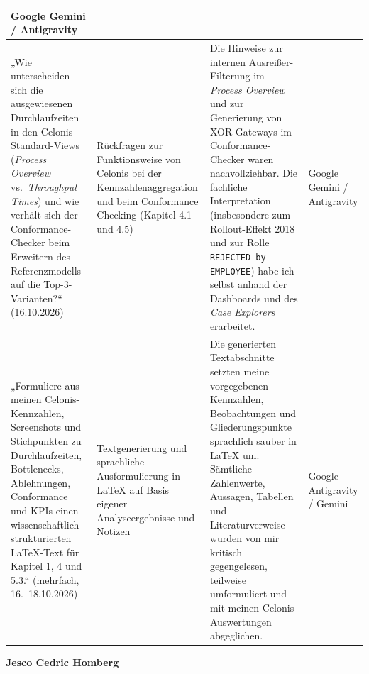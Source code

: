 \begin{landscape}
\begin{longtable}{|p{6.5cm}|p{5cm}|p{8cm}|p{4cm}|}
Google Gemini / Antigravity \\
\hline
„Wie unterscheiden sich die ausgewiesenen Durchlaufzeiten in den Celonis-Standard-Views (\textit{Process Overview} vs.\ \textit{Throughput Times}) und wie verhält sich der Conformance-Checker beim Erweitern des Referenzmodells auf die Top-3-Varianten?“ (16.10.2026) &
Rückfragen zur Funktionsweise von Celonis bei der Kennzahlenaggregation und beim Conformance Checking (Kapitel 4.1 und 4.5) &
Die Hinweise zur internen Ausreißer-Filterung im \textit{Process Overview} und zur Generierung von XOR-Gateways im Conformance-Checker waren nachvollziehbar. Die fachliche Interpretation (insbesondere zum Rollout-Effekt 2018 und zur Rolle \texttt{REJECTED by EMPLOYEE}) habe ich selbst anhand der Dashboards und des \textit{Case Explorers} erarbeitet. &
Google Gemini / Antigravity \\
\hline
„Formuliere aus meinen Celonis-Kennzahlen, Screenshots und Stichpunkten zu Durchlaufzeiten, Bottlenecks, Ablehnungen, Conformance und KPIs einen wissenschaftlich strukturierten LaTeX-Text für Kapitel 1, 4 und 5.3.“ (mehrfach, 16.--18.10.2026) &
Textgenerierung und sprachliche Ausformulierung in LaTeX auf Basis eigener Analyseergebnisse und Notizen &
Die generierten Textabschnitte setzten meine vorgegebenen Kennzahlen, Beobachtungen und Gliederungspunkte sprachlich sauber in LaTeX um. Sämtliche Zahlenwerte, Aussagen, Tabellen und Literaturverweise wurden von mir kritisch gegengelesen, teilweise umformuliert und mit meinen Celonis-Auswertungen abgeglichen. &
Google Antigravity / Gemini \\
\hline
\end{longtable}

\newpage

\noindent\textbf{\large Jesco Cedric Homberg}
\vspace{3mm}


\end{landscape}
